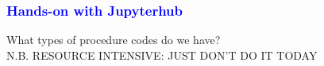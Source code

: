 \documentclass[11pt,pdftex,dvipsnames,usenames]{beamer}
\begin{document}
\begin{comment}
\begin{frame}[fragile]\frametitle{\bf\textcolor{blue}{Cancer Research with RASMACRO}}

\begin{itemize}
\item We have already mentioned NCI SEER
\item Another resource is NCI's
\textcolor{PineGreen}{[\href{https://healthcaredelivery.cancer.gov/seermedicare}
{SEER-Medicare Linked Database}]}
\item For example, \textcolor{PineGreen}{[\href{https://healthcaredelivery.cancer.gov/seermedicare/aboutdata/hcpcs.html}{a resource for identifying HCPCS/CPT codes}]}
\item

\item Here, automated processing would be very challenging with R
\item This is a job for ... RASMACRO!
\item See the file \texttt{oral\_meds.sas}
\end{itemize}
\end{frame}
\end{comment}


\begin{frame}[fragile]\frametitle{\bf\textcolor{blue}{Hands-on with Jupyterhub}}
What types of procedure codes do we have? \\ 
N.B. RESOURCE INTENSIVE: JUST DON'T DO IT TODAY

\end{frame}
\end{document}
